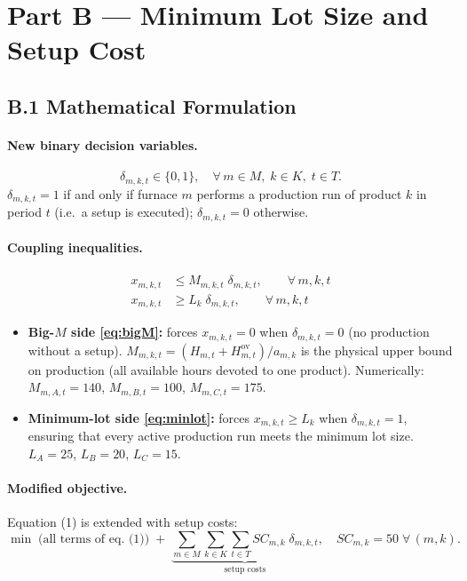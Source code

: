 \documentclass[11pt,a4paper]{article}
\begin{document}
\newpage
\section{Part B --- Minimum Lot Size and Setup Cost}

\subsection{B.1\; Mathematical Formulation}

\paragraph{New binary decision variables.}
\begin{equation*}
  \delta_{m,k,t} \in \{0,1\}, \quad \forall\,m\in M,\;k\in K,\;t\in T.
\end{equation*}
$\delta_{m,k,t}=1$ if and only if furnace $m$ performs a production run of
product $k$ in period $t$ (i.e.\ a setup is executed); $\delta_{m,k,t}=0$
otherwise.

\paragraph{Coupling inequalities.}
\begin{align}
  x_{m,k,t} &\leq M_{m,k,t}\;\delta_{m,k,t},
  \qquad \forall\,m,k,t \tag{B1}\label{eq:bigM}\\[4pt]
  x_{m,k,t} &\geq L_k\;\delta_{m,k,t},
  \qquad \forall\,m,k,t \tag{B2}\label{eq:minlot}
\end{align}
\begin{itemize}
  \item \textbf{Big-$M$ side \eqref{eq:bigM}:} forces $x_{m,k,t}=0$ when
    $\delta_{m,k,t}=0$ (no production without a setup).
    $M_{m,k,t}=(H_{m,t}+H^{\mathrm{ov}}_{m,t})/a_{m,k}$ is the physical
    upper bound on production (all available hours devoted to one product).
    Numerically: $M_{m,A,t}=140$, $M_{m,B,t}=100$, $M_{m,C,t}=175$.
  \item \textbf{Minimum-lot side \eqref{eq:minlot}:} forces
    $x_{m,k,t}\geq L_k$ when $\delta_{m,k,t}=1$, ensuring that every active
    production run meets the minimum lot size.
    $L_A=25$, $L_B=20$, $L_C=15$.
\end{itemize}

\paragraph{Modified objective.}
Equation (1) is extended with setup costs:
\[
  \min\;\text{(all terms of eq.\ (1))}\;
  +\;\underbrace{\sum_{m\in M}\sum_{k\in K}\sum_{t\in T}
     SC_{m,k}\;\delta_{m,k,t}}_{\text{setup costs}},
     \quad SC_{m,k}=50\;\forall\,(m,k).
\]
\end{document}
